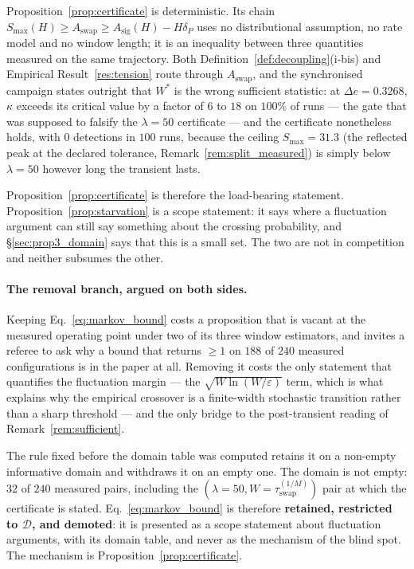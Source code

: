 Proposition~\ref{prop:certificate} is deterministic. Its chain
$S_{\max}(H) \ge A_{\mathrm{swap}} \ge A_{\mathrm{sig}}(H) - H\delta_P$ uses no
distributional assumption, no rate model and no window length; it is an
inequality between three quantities measured on the same trajectory. Both
Definition~\ref{def:decoupling}(i-bis) and Empirical
Result~\ref{res:tension} route through $A_{\mathrm{swap}}$, and the
synchronised campaign states outright that $W^*$ is the wrong sufficient
statistic: at $\Delta e = 0.3268$, $\kappa$ exceeds its critical value by a
factor of $6$ to $18$ on $100\%$ of runs --- the gate that was supposed to
falsify the $\lambda = 50$ certificate --- and the certificate nonetheless holds,
with $0$ detections in $100$ runs, because the ceiling
$S_{\max} = 31.3$ (the reflected peak at the declared tolerance,
Remark~\ref{rem:split_measured}) is simply below $\lambda = 50$ however long
the transient lasts.

Proposition~\ref{prop:certificate} is therefore the load-bearing statement.
Proposition~\ref{prop:starvation} is a scope statement: it says where a
fluctuation argument can still say something about the crossing probability,
and \S\ref{sec:prop3_domain} says that this is a small set. The two are not in
competition and neither subsumes the other.

\paragraph{The removal branch, argued on both sides.}
Keeping Eq.~\eqref{eq:markov_bound} costs a proposition that is vacant at the
measured operating point under two of its three window estimators, and invites
a referee to ask why a bound that returns $\ge 1$ on $188$ of $240$ measured
configurations is in the paper at all. Removing it costs the only statement
that quantifies the fluctuation margin --- the $\sqrt{W \ln(W/\varepsilon)}$
term, which is what explains why the empirical crossover is a finite-width
stochastic transition rather than a sharp threshold --- and the only bridge to
the post-transient reading of Remark~\ref{rem:sufficient}.

The rule fixed before the domain table was computed retains it on a
non-empty informative domain and withdraws it on an empty one. The domain is
not empty: $32$ of $240$ measured pairs, including the $(\lambda = 50,
W = \tau_{\mathrm{swap}}^{(1/M)})$ pair at which the certificate is stated.
Eq.~\eqref{eq:markov_bound} is therefore \textbf{retained, restricted to
$\mathcal{D}$, and demoted}: it is presented as a scope statement about
fluctuation arguments, with its domain table, and never as the mechanism of the
blind spot. The mechanism is Proposition~\ref{prop:certificate}.

